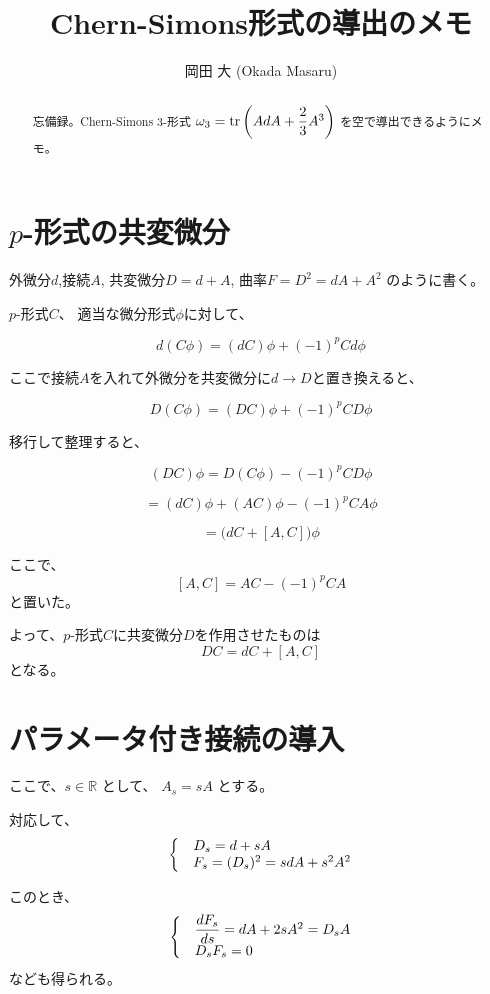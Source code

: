 \documentclass[uplatex]{jsarticle}
\title{
Chern-Simons形式の導出のメモ
}
\author{
岡田 大 (Okada Masaru)
}
\begin{document}
\maketitle

\begin{abstract}
	忘備録。Chern-Simons 3-形式
	$\omega_{3} = {\rm tr} \left( {AdA + \dfrac{2}{3}A^{3}} \right) $
	を空で導出できるようにメモ。
\end{abstract}

\section{$p$-形式の共変微分}


外微分$d$,接続$A$,
共変微分$D=d+A$,
曲率$F=D^{2} = dA+A^{2}$
のように書く。

$p$-形式$C$、
適当な微分形式$\phi$に対して、

$$
	d(C\phi)
	=(dC)\phi + (-1)^{p}Cd\phi
$$

ここで接続$A$を入れて外微分を共変微分に$d \to D$と置き換えると、

$$
	D(C\phi)
	=(DC)\phi + (-1)^{p}CD\phi
$$

移行して整理すると、

$$
	(DC)\phi
	= D(C\phi) - (-1)^{p}CD\phi
$$

$$
	= (dC) \phi + (AC) \phi - (-1)^{p}CA\phi
$$

$$
	= \big( dC + [A,C] \big) \phi
$$

ここで、
$$
	[A,C]
	=
	AC - (-1)^{p}CA
$$
と置いた。

よって、$p$-形式$C$に共変微分$D$を作用させたものは
$$
	DC = dC + [A,C]
$$
となる。


\section{パラメータ付き接続の導入}

ここで、$s \in \mathbb{R}$ として、 $A_{s} = sA$ とする。

対応して、
$$
	\left\{
	\begin{matrix}
		 & \hspace{-57pt} D_{s} = d + sA           \\
		 & F_{s} = (D_{s})^{2} = sdA + s^{2} A^{2}
	\end{matrix}
	\right.
$$

このとき、
$$
	\left\{
	\begin{matrix}
		 & \dfrac{dF_{s}}{ds} = dA + 2sA^{2} = D_{s} A \\
		 & \hspace{-70pt} D_{s} F_{s} = 0
	\end{matrix}
	\right.
$$
なども得られる。
\end{document}
